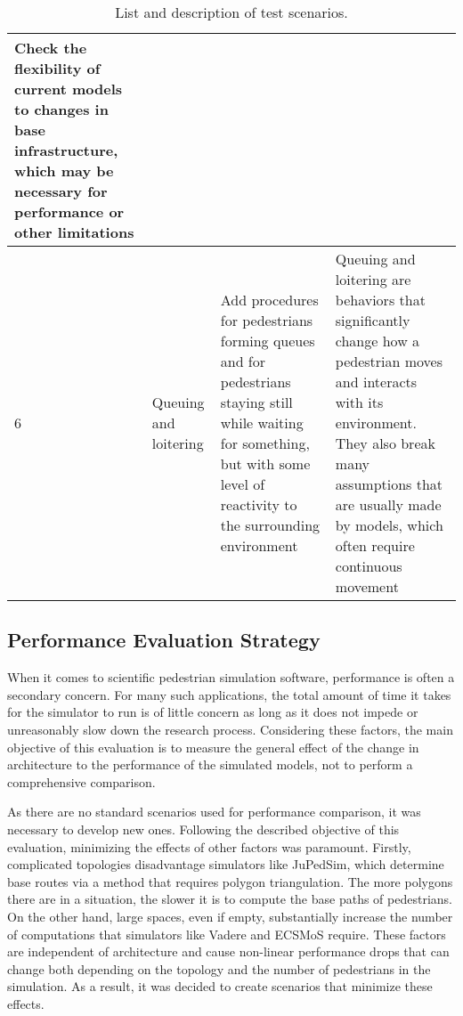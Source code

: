 \documentclass[twoside, 11pt]{article}
\begin{document}
\begin{center}
\begin{table}[h!]
\begin{tabularx}{\textwidth}{ | l | p{3.7cm}| X | p{5cm} | }
      Check the flexibility of current models to changes in base infrastructure, which may be necessary for performance or other limitations \cite{kleinmeierVadereOpenSourceSimulation2019}\\
      \hline
      6 & 
      Queuing and loitering&  
      Add procedures for pedestrians forming queues and for pedestrians staying still while waiting for something, but with some level of reactivity to the surrounding environment& 
      Queuing and loitering are behaviors that significantly change how a pedestrian moves and interacts with its environment. They also break many assumptions that are usually made by models, which often require continuous movement \cite{KIM2013232}\\
      \hline
    \end{tabularx}
    \caption{List and description of test scenarios.}
    \label{table:test-scenarios}
  \end{table}
\end{center}






\subsection{Performance Evaluation Strategy} \label{sec:performace-evaluation}

When it comes to scientific pedestrian simulation software, performance is often a secondary concern. For many such applications, the total amount of time it takes for the simulator to run is of little concern as long as it does not impede or unreasonably slow down the research process. Considering these factors, the main objective of this evaluation is to measure the general effect of the change in architecture to the performance of the simulated models, not to perform a comprehensive comparison. 

As there are no standard scenarios used for performance comparison, it was necessary to develop new ones. Following the described objective of this evaluation, minimizing the effects of other factors was paramount. Firstly, complicated topologies disadvantage simulators like JuPedSim, which determine base routes via a method that requires polygon triangulation. The more polygons there are in a situation, the slower it is to compute the base paths of pedestrians. On the other hand, large spaces, even if empty, substantially increase the number of computations that simulators like Vadere and ECSMoS require. These factors are independent of architecture and cause non-linear performance drops that can change both depending on the topology and the number of pedestrians in the simulation. As a result, it was decided to create scenarios that minimize these effects.
\end{document}
